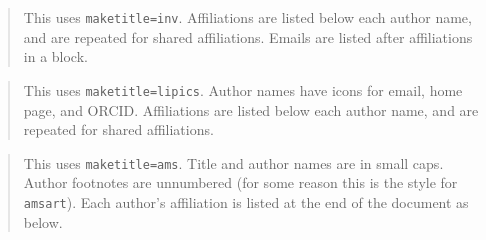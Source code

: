 \documentclass{article}
\begin{document}
\newpage
{}
\label{inv}
\setcounter{footnote}{0}
\begin{savenotes}
\makeatletter
\METAC@inv@maketitle
\makeatother
\end{savenotes}

\begin{quote}
This uses \texttt{maketitle=inv}. Affiliations are listed below each author name, and are repeated for shared
affiliations. Emails are listed after affiliations in a block.
\end{quote}

\newpage
{}
\label{lipics}
\setcounter{footnote}{0}
\makeatletter
\METAC@lipics@maketitle
\makeatother
\begin{quote}
This uses \texttt{maketitle=lipics}. Author names have icons for email, home page, and ORCID.
Affiliations are listed below each author name, and are repeated for shared
affiliations.
\end{quote}

\newpage
{}
\label{ams}
\setcounter{footnote}{0}
\makeatletter
\METAC@ams@maketitle
\makeatother
\begin{quote}
This uses \texttt{maketitle=ams}. Title and author names are in small caps.
Author footnotes are unnumbered (for some reason this is the style
for \texttt{amsart}). Each author's affiliation is listed at the end of the document as below.
\end{quote}
\end{document}

